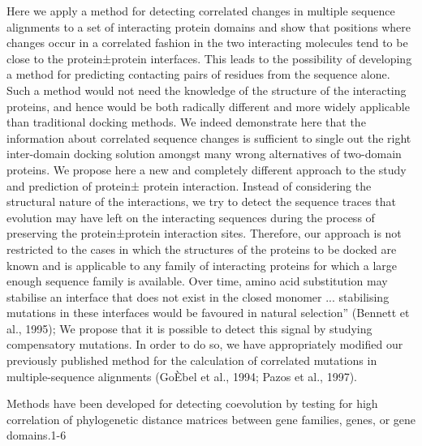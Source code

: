 Here we apply a method for detecting correlated changes in multiple sequence alignments to a set of interacting protein domains and show that positions where changes occur in a correlated fashion in the two interacting molecules tend to be close to the protein±protein interfaces.  \cite{pazos1997correlated}
This leads to the possibility of developing a method for predicting contacting pairs of residues from the sequence alone. Such a method would not need the knowledge of the structure of the interacting proteins, and hence would be both radically different and more widely applicable than traditional docking methods. \cite{pazos1997correlated}
We indeed demonstrate here that the information about correlated sequence changes is sufficient to single out the right inter-domain docking solution amongst many wrong alternatives of two-domain proteins. \cite{pazos1997correlated}
We propose here a new and completely different approach to the study and prediction of protein± protein interaction. Instead of considering the structural nature of the interactions, we try to detect the sequence traces that evolution may have left on the interacting sequences during the process of preserving the protein±protein interaction sites. \cite{pazos1997correlated}
Therefore, our approach is not restricted to the cases in which the structures of the proteins to be docked are known and is applicable to any family of interacting proteins for which a large enough sequence family is available. \cite{pazos1997correlated}
Over time, amino acid substitution may stabilise an interface that does not exist in the closed monomer ... stabilising mutations in these interfaces would be favoured in natural selection'' (Bennett et al., 1995); \cite{pazos1997correlated}
We propose that it is possible to detect this signal by studying compensatory mutations. In order to do so, we have appropriately modified our previously published method for the calculation of correlated mutations in multiple-sequence alignments (GoÈbel et al., 1994; Pazos et al., 1997). \cite{pazos1997correlated}



Methods have been developed for detecting coevolution by testing for high correlation of phylogenetic distance matrices between gene families, genes, or gene domains.1-6 \cite{rohlfs2010detecting}

